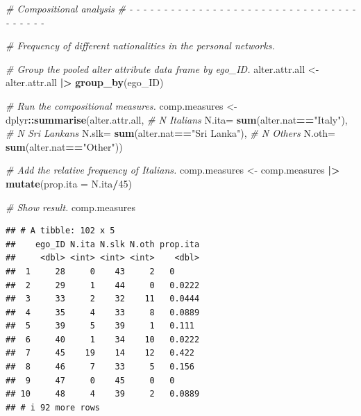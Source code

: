\documentclass[
]{book}
\newenvironment{Shaded}{\begin{snugshade}}{\end{snugshade}}
\newcommand{\AttributeTok}[1]{\textcolor[rgb]{0.13,0.29,0.53}{#1}}
\newcommand{\CommentTok}[1]{\textcolor[rgb]{0.56,0.35,0.01}{\textit{#1}}}
\newcommand{\DecValTok}[1]{\textcolor[rgb]{0.00,0.00,0.81}{#1}}
\newcommand{\FunctionTok}[1]{\textcolor[rgb]{0.13,0.29,0.53}{\textbf{#1}}}
\newcommand{\NormalTok}[1]{#1}
\newcommand{\OtherTok}[1]{\textcolor[rgb]{0.56,0.35,0.01}{#1}}
\newcommand{\SpecialCharTok}[1]{\textcolor[rgb]{0.81,0.36,0.00}{\textbf{#1}}}
\newcommand{\StringTok}[1]{\textcolor[rgb]{0.31,0.60,0.02}{#1}}
\begin{document}
\begin{Shaded}
\begin{Highlighting}[]
\CommentTok{\# Compositional analysis}
\CommentTok{\# {-} {-} {-} {-} {-} {-} {-} {-} {-} {-} {-} {-} {-} {-} {-} {-} {-} {-} {-} {-} {-} {-} {-} {-} {-} {-} {-} {-} {-} {-} {-} {-} {-} {-} {-} {-} {-} {-} {-} }

\CommentTok{\# Frequency of different nationalities in the personal networks.}

\CommentTok{\# Group the pooled alter attribute data frame by ego\_ID.}
\NormalTok{alter.attr.all }\OtherTok{\textless{}{-}}\NormalTok{ alter.attr.all }\SpecialCharTok{|\textgreater{}} 
  \FunctionTok{group\_by}\NormalTok{(ego\_ID)}

\CommentTok{\# Run the compositional measures.}
\NormalTok{comp.measures }\OtherTok{\textless{}{-}}\NormalTok{ dplyr}\SpecialCharTok{::}\FunctionTok{summarise}\NormalTok{(alter.attr.all, }
                                  \CommentTok{\# N Italians}
                                  \AttributeTok{N.ita=} \FunctionTok{sum}\NormalTok{(alter.nat}\SpecialCharTok{==}\StringTok{"Italy"}\NormalTok{), }
                                  \CommentTok{\# N Sri Lankans}
                                  \AttributeTok{N.slk=} \FunctionTok{sum}\NormalTok{(alter.nat}\SpecialCharTok{==}\StringTok{"Sri Lanka"}\NormalTok{), }
                                  \CommentTok{\# N Others}
                                  \AttributeTok{N.oth=} \FunctionTok{sum}\NormalTok{(alter.nat}\SpecialCharTok{==}\StringTok{"Other"}\NormalTok{))}

\CommentTok{\# Add the relative frequency of Italians.}
\NormalTok{comp.measures }\OtherTok{\textless{}{-}}\NormalTok{ comp.measures }\SpecialCharTok{|\textgreater{}} 
  \FunctionTok{mutate}\NormalTok{(}\AttributeTok{prop.ita =}\NormalTok{ N.ita}\SpecialCharTok{/}\DecValTok{45}\NormalTok{)}

\CommentTok{\# Show result.}
\NormalTok{comp.measures}
\end{Highlighting}
\end{Shaded}

\begin{verbatim}
## # A tibble: 102 x 5
##    ego_ID N.ita N.slk N.oth prop.ita
##     <dbl> <int> <int> <int>    <dbl>
##  1     28     0    43     2   0     
##  2     29     1    44     0   0.0222
##  3     33     2    32    11   0.0444
##  4     35     4    33     8   0.0889
##  5     39     5    39     1   0.111 
##  6     40     1    34    10   0.0222
##  7     45    19    14    12   0.422 
##  8     46     7    33     5   0.156 
##  9     47     0    45     0   0     
## 10     48     4    39     2   0.0889
## # i 92 more rows
\end{verbatim}
\end{document}
